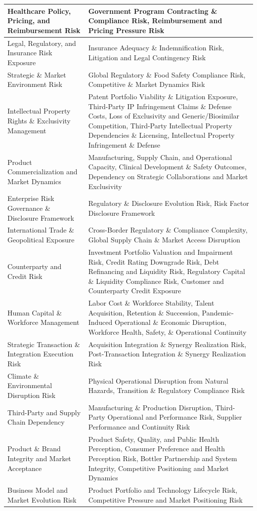 \documentclass[11pt, a4paper]{article}
\begin{document}
\begin{longtable}{@{}L{0.31\textwidth}L{0.63\textwidth}@{}}
Healthcare Policy, Pricing, and Reimbursement Risk & Government Program Contracting \& Compliance Risk, Reimbursement and Pricing Pressure Risk \\ \hline
Legal, Regulatory, and Insurance Risk Exposure & Insurance Adequacy \& Indemnification Risk, Litigation and Legal Contingency Risk \\ \hline
Strategic \& Market Environment Risk & Global Regulatory \& Food Safety Compliance Risk, Competitive \& Market Dynamics Risk \\ \hline
Intellectual Property Rights \& Exclusivity Management & Patent Portfolio Viability \& Litigation Exposure, Third-Party IP Infringement Claims \& Defense Costs, Loss of Exclusivity and Generic/Biosimilar Competition, Third-Party Intellectual Property Dependencies \& Licensing, Intellectual Property Infringement \& Defense \\ \hline
Product Commercialization and Market Dynamics & Manufacturing, Supply Chain, and Operational Capacity, Clinical Development \& Safety Outcomes, Dependency on Strategic Collaborations and Market Exclusivity \\ \hline
Enterprise Risk Governance \& Disclosure Framework & Regulatory \& Disclosure Evolution Risk, Risk Factor Disclosure Framework \\ \hline
International Trade \& Geopolitical Exposure & Cross-Border Regulatory \& Compliance Complexity, Global Supply Chain \& Market Access Disruption \\ \hline
Counterparty and Credit Risk & Investment Portfolio Valuation and Impairment Risk, Credit Rating Downgrade Risk, Debt Refinancing and Liquidity Risk, Regulatory Capital \& Liquidity Compliance Risk, Customer and Counterparty Credit Exposure \\ \hline
Human Capital \& Workforce Management & Labor Cost \& Workforce Stability, Talent Acquisition, Retention \& Succession, Pandemic-Induced Operational \& Economic Disruption, Workforce Health, Safety, \& Operational Continuity \\ \hline
Strategic Transaction \& Integration Execution Risk & Acquisition Integration \& Synergy Realization Risk, Post-Transaction Integration \& Synergy Realization Risk \\ \hline
Climate \& Environmental Disruption Risk & Physical Operational Disruption from Natural Hazards, Transition \& Regulatory Compliance Risk \\ \hline
Third-Party and Supply Chain Dependency & Manufacturing \& Production Disruption, Third-Party Operational and Performance Risk, Supplier Performance and Continuity Risk \\ \hline
Product \& Brand Integrity and Market Acceptance & Product Safety, Quality, and Public Health Perception, Consumer Preference and Health Perception Risk, Bottler Partnership and System Integrity, Competitive Positioning and Market Dynamics \\ \hline
Business Model and Market Evolution Risk & Product Portfolio and Technology Lifecycle Risk, Competitive Pressure and Market Positioning Risk \\
\end{longtable}
\end{document}
